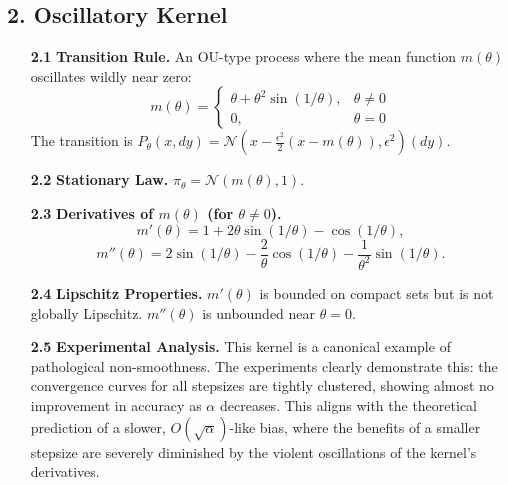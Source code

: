 \documentclass[a4paper]{article}
\begin{document}
\subsection*{2. Oscillatory Kernel}
\begin{itemize}
	\item[\bfseries 2.1] \textbf{Transition Rule.} An OU-type process where the mean function \(m(\theta)\) oscillates wildly near zero:
	\[ m(\theta)= \begin{cases} \theta+\theta^2\sin(1/\theta), & \theta\neq0 \\ 0, & \theta=0 \end{cases} \]
	The transition is \( P_\theta(x,dy)=\mathcal{N}\!\left(x-\tfrac{\epsilon^2}{2}(x-m(\theta)), \epsilon^2\right)(dy) \).
	\item[\bfseries 2.2] \textbf{Stationary Law.} \(\pi_\theta = \mathcal{N}(m(\theta),1)\).
	\item[\bfseries 2.3] \textbf{Derivatives of \(m(\theta)\) (for \(\theta\neq0\)).}
	\[ m'(\theta)=1+2\theta\sin(1/\theta)-\cos(1/\theta), \]
	\[ m''(\theta)=2\sin(1/\theta)-\frac{2}{\theta}\cos(1/\theta)-\frac{1}{\theta^2}\sin(1/\theta). \]
	\item[\bfseries 2.4] \textbf{Lipschitz Properties.} \(m'(\theta)\) is bounded on compact sets but is not globally Lipschitz. \(m''(\theta)\) is unbounded near \(\theta=0\).
	\item[\bfseries 2.5] \textbf{Experimental Analysis.} This kernel is a canonical example of pathological non-smoothness. The experiments clearly demonstrate this: the convergence curves for all stepsizes are tightly clustered, showing almost no improvement in accuracy as \(\alpha\) decreases. This aligns with the theoretical prediction of a slower, \(O(\sqrt{\alpha})\)-like bias, where the benefits of a smaller stepsize are severely diminished by the violent oscillations of the kernel's derivatives.
\end{itemize}
\end{document}
